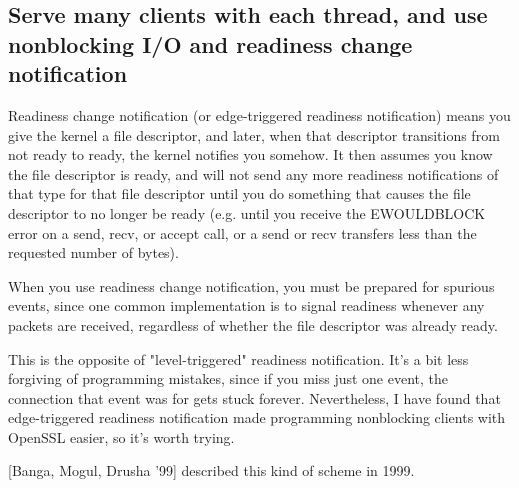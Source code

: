 \documentclass[twoside, xetex]{report}
\begin{document}
\subsection*{Serve many clients with each thread, and use nonblocking I/O and readiness change notification}

Readiness change notification (or edge-triggered readiness notification) means you give the kernel a file descriptor, and later, when that descriptor transitions from not ready to ready, the kernel notifies you somehow. It then assumes you know the file descriptor is ready, and will not send any more readiness notifications of that type for that file descriptor until you do something that causes the file descriptor to no longer be ready (e.g. until you receive the EWOULDBLOCK error on a send, recv, or accept call, or a send or recv transfers less than the requested number of bytes).

When you use readiness change notification, you must be prepared for spurious events, since one common implementation is to signal readiness whenever any packets are received, regardless of whether the file descriptor was already ready.

This is the opposite of "level-triggered" readiness notification. It's a bit less forgiving of programming mistakes, since if you miss just one event, the connection that event was for gets stuck forever. Nevertheless, I have found that edge-triggered readiness notification made programming nonblocking clients with OpenSSL easier, so it's worth trying.

[Banga, Mogul, Drusha '99] described this kind of scheme in 1999.
\end{document}
